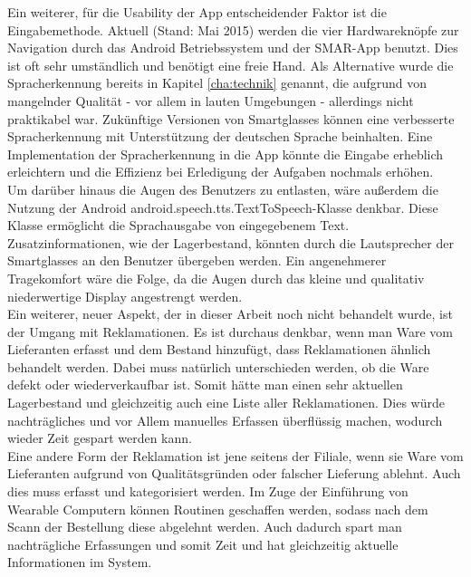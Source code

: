 Ein weiterer, für die Usability der App entscheidender Faktor ist die Eingabemethode. Aktuell (Stand: Mai 2015) werden die vier Hardwareknöpfe zur Navigation durch das Android Betriebssystem und der \ac{SMAR}-App benutzt. Dies ist oft sehr umständlich und benötigt eine freie Hand. Als Alternative wurde die Spracherkennung bereits in Kapitel \ref{cha:technik}  genannt, die aufgrund von mangelnder Qualität - vor allem in lauten Umgebungen - allerdings nicht praktikabel war. Zukünftige Versionen von Smartglasses können eine verbesserte Spracherkennung mit Unterstützung der deutschen Sprache beinhalten. Eine Implementation der Spracherkennung in die App könnte die Eingabe erheblich erleichtern und die Effizienz bei Erledigung der Aufgaben nochmals erhöhen.\\
Um darüber hinaus die Augen des Benutzers zu entlasten, wäre außerdem die Nutzung der Android \glqq android.speech.tts.TextToSpeech\grqq -Klasse denkbar. Diese Klasse ermöglicht die Sprachausgabe von eingegebenem Text. Zusatzinformationen, wie \zB der Lagerbestand, könnten durch die Lautsprecher der Smartglasses an den Benutzer übergeben werden. Ein angenehmerer Tragekomfort wäre die Folge, da die Augen durch das kleine und qualitativ niederwertige Display angestrengt werden.\\

Ein weiterer, neuer Aspekt, der in dieser Arbeit noch nicht behandelt wurde, ist der Umgang mit Reklamationen. Es ist durchaus denkbar, wenn man Ware vom Lieferanten erfasst und dem Bestand hinzufügt, dass Reklamationen ähnlich behandelt werden. Dabei muss natürlich unterschieden werden, ob die Ware defekt oder wiederverkaufbar ist. Somit hätte man einen sehr aktuellen Lagerbestand und gleichzeitig auch eine Liste aller Reklamationen. Dies würde nachträgliches und vor Allem manuelles Erfassen überflüssig machen, wodurch wieder Zeit gespart werden kann. \\

Eine andere Form der Reklamation ist jene seitens der Filiale, wenn sie Ware vom Lieferanten aufgrund von Qualitätsgründen oder falscher Lieferung ablehnt. Auch dies muss erfasst und kategorisiert werden. Im Zuge der Einführung von Wearable Computern können Routinen geschaffen werden, sodass nach dem Scann der Bestellung diese abgelehnt werden. Auch dadurch spart man nachträgliche Erfassungen und somit Zeit und hat gleichzeitig aktuelle Informationen im System.\\

